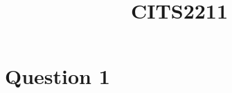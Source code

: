 \documentclass[a4paper]{article}
\title{\textbf{CITS2211}}
\author{}
\date{}
\begin{document}
\maketitle
\thispagestyle{empty}

\section*{Question 1}
\end{document}
